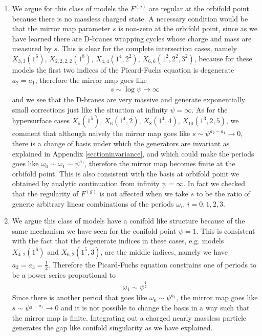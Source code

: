 \documentclass[12pt]{article}
\begin{document}
\begin{enumerate}
\item We argue for this class of models the $F^{(g)}$ are regular
at the orbifold point because there is no massless charged state.
A necessary condition would be that the mirror map parameter
$s$ is non-zero at the orbifold point, since as we have
learned there are D-branes wrapping cycles whose charge and mass
are measured by $s$. This is clear for the complete
intersection cases, namely $X_{3,3}(1^6)$, $X_{2,2,2,2}(1^8)$,
$X_{4,4}(1^4,2^2)$, $X_{6,6}(1^2,2^2,3^2)$, because for these
models the first two indices of the Picard-Fuchs equation is
degenerate $a_2=a_1$, therefore the mirror map goes like
\begin{eqnarray}
s\sim \log{\psi}\rightarrow \infty
\end{eqnarray}
and we see that the D-branes are very massive and generate
exponentially small corrections just like the situation at
infinity $\psi=\infty$. As for the hypersurface cases $X_5(1^5)$,
$X_6(1^4,2)$, $X_8(1^4,4)$, $X_{10}(1^3,2,5)$, we comment that
although naively the mirror map goes like $s\sim
\psi^{a_2-a_1}\rightarrow 0 $, there is a change of basis under
which the generators are invariant as explained in Appendix
\ref{sectioninvariance}, and which could make the periods goes
like $\omega_0\sim\omega_1\sim \psi^{a_1}$, therefore the mirror
map becomes finite at the orbifold point. This is also consistent
with the basis at orbifold point we obtained by analytic
continuation from infinity $\psi=\infty$. In fact we checked that the regularity 
of $F^{(g)}$ is not affected when we take $s$ to be the ratio of generic 
arbitrary linear combinations of the periods $\omega_i$, $i=0,1,2,3$.  

\item We argue this class of models have a conifold like structure
because of the same mechanism we have seen for the conifold point
$\psi=1$. This is consistent with the fact that the degenerate
indices in these cases, e.g. models $X_{4,2}(1^6)$ and
$X_{6,2}(1^5,3)$, are the middle indices, namely we have
$a_2=a_3=\frac{1}{2}$. Therefore the Picard-Fuchs equation
constrains one of periods to be a power series proportional to
\begin{eqnarray}
\omega_1\sim \psi^{\frac{1}{2}}
\end{eqnarray}
Since there is another period that goes like $\omega_0\sim
\psi^{a_1}$, the mirror map goes like $s\sim
\psi^{\frac{1}{2}-a_1}\rightarrow 0$ and it is not possible to
change the basis in a way such that the mirror map is finite.
Integrating out a charged nearly massless particle generates the
gap like conifold singularity as we have explained.


\end{enumerate}
\end{document}
